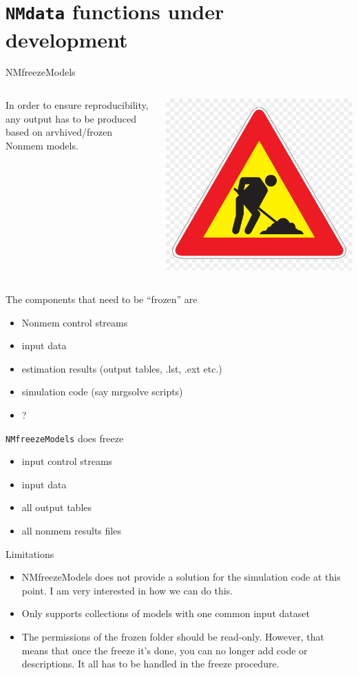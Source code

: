 \documentclass[
  8pt,
  ignorenonframetext,
  aspectratio=169]{beamer}
\providecommand{\tightlist}{%
  \setlength{\itemsep}{0pt}\setlength{\parskip}{0pt}}
\begin{document}
\hypertarget{nmdata-functions-under-development}{%
\section{\texorpdfstring{\texttt{NMdata} functions under
development}{NMdata functions under development}}\label{nmdata-functions-under-development}}

\begin{frame}[fragile]{NMfreezeModels}
\protect\hypertarget{nmfreezemodels}{}
\begin{columns}[T]
\begin{column}{0.85\textwidth}
In order to ensure reproducibility, any output has to be produced based
on arvhived/frozen Nonmem models.
\end{column}

\begin{column}{0.15\textwidth}
\includegraphics[width=.5in]{figures/worksign.png}
\end{column}
\end{columns}

The components that need to be ``frozen'' are

\begin{itemize}
\tightlist
\item
  Nonmem control streams
\item
  input data
\item
  estimation results (output tables, .lst, .ext etc.)
\item
  simulation code (say mrgsolve scripts)
\item
  ?
\end{itemize}

\texttt{NMfreezeModels} does freeze

\begin{itemize}
\tightlist
\item
  input control streams
\item
  input data
\item
  all output tables
\item
  all nonmem results files
\end{itemize}

Limitations

\begin{itemize}
\tightlist
\item
  NMfreezeModels does not provide a solution for the simulation code at
  this point. I am very interested in how we can do this.
\item
  Only supports collections of models with one common input dataset
\item
  The permissions of the frozen folder should be read-only. However,
  that means that once the freeze it's done, you can no longer add code
  or descriptions. It all has to be handled in the freeze procedure.
\end{itemize}
\end{frame}
\end{document}
